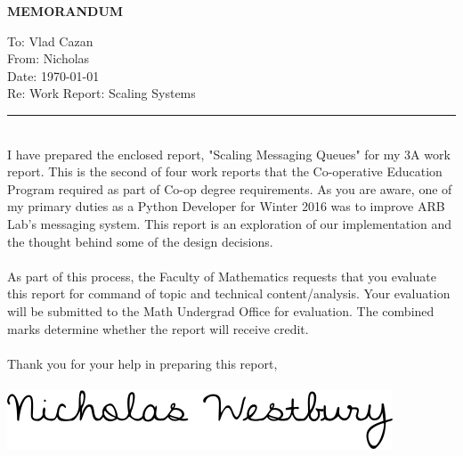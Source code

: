 \documentclass[12pt]{report}
\newcommand{\HRule}[1]{\rule{\linewidth}{#1}}
\begin{document}
\newpage\noindent\thispagestyle{empty}
\LARGE\textbf{\uppercase{MEMORANDUM}} \normalsize
\vspace*{-10px}
\begin{singlespacing}\noindent
\vspace*{-10px}
To: Vlad Cazan\\
\vspace*{-10px}
From: Nicholas\\
\vspace*{-10px}
Date: \today\\
\vspace*{-10px}
Re: Work Report: Scaling Systems\\
\end{singlespacing}
\HRule{1.5pt}\\
I have prepared the enclosed report, "Scaling Messaging Queues" for my 3A work report. This is the second of four work reports that the Co-operative Education Program required as part of Co-op degree requirements. As you are aware, one of my primary duties as a Python Developer for Winter 2016 was to improve ARB Lab's messaging system. This report is an exploration of our implementation and the thought behind some of the design decisions.\\ \\ \noindent
As part of this process, the Faculty of Mathematics requests that you evaluate this report for command of topic and technical content/analysis. Your evaluation will be submitted to the Math Undergrad Office for evaluation. The combined marks determine whether the report will receive credit. \\ \\
Thank you for your help in preparing this report,\\ \\ \noindent
\includegraphics[scale=0.55]{signature}

\newpage\thispagestyle{fancy}\sectionfont{\scshape}
\end{document}
